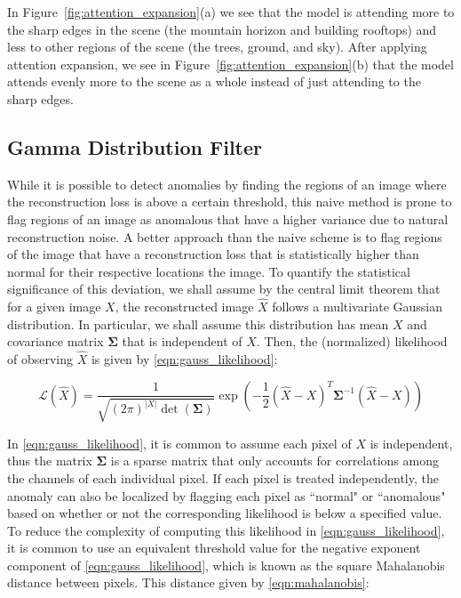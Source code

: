 \documentclass[12pt]{article}
\begin{document}
In Figure~\ref{fig:attention_expansion}(a) we see that the model is attending more to the sharp edges in the scene (the mountain horizon and building rooftops) and less to other regions of the scene (the trees, ground, and sky). After applying attention expansion, we see in Figure~\ref{fig:attention_expansion}(b) that the model attends evenly more to the scene as a whole instead of just attending to the sharp edges.

\subsection{Gamma Distribution Filter}

While it is possible to detect anomalies by finding the regions of an image where the reconstruction loss is above a certain threshold, this naive method is prone to flag regions of an image as anomalous that have a higher variance due to natural reconstruction noise. A better approach than the naive scheme is to flag regions of the image that have a reconstruction loss that is statistically higher than normal for their respective locations the image. To quantify the statistical significance of this deviation, we shall assume by the central limit theorem that for a given image $X$, the reconstructed image $\hat{X}$ follows a multivariate Gaussian distribution. In particular, we shall assume this distribution has mean $X$ and covariance matrix $\mathbf{\Sigma}$ that is independent of $X$. Then, the (normalized) likelihood of observing $\hat{X}$ is given by \eqref{eqn:gauss_likelihood}:

\begin{equation}
\mathcal{L}(\hat{X}) = \frac{1}{\sqrt{(2\pi)^{|X|} \det(\mathbf{\Sigma})}}\exp\left(-\frac{1}{2}(\hat{X} - X)^T\mathbf{\Sigma}^{-1}(\hat{X} - X)\right)
\label{eqn:gauss_likelihood}
\end{equation}

In \eqref{eqn:gauss_likelihood}, it is common to assume each pixel of $X$ is independent, thus the matrix $\mathbf{\Sigma}$ is a sparse matrix that only accounts for correlations among the channels of each individual pixel. If each pixel is treated independently, the anomaly can also be localized by flagging each pixel as ``normal" or ``anomalous" based on whether or not the corresponding likelihood is below a specified value. To reduce the complexity of computing this likelihood in \eqref{eqn:gauss_likelihood}, it is common to use an equivalent threshold value for the negative exponent component of \eqref{eqn:gauss_likelihood}, which is known as the square Mahalanobis distance between pixels. This distance given by \eqref{eqn:mahalanobis}:
\end{document}
